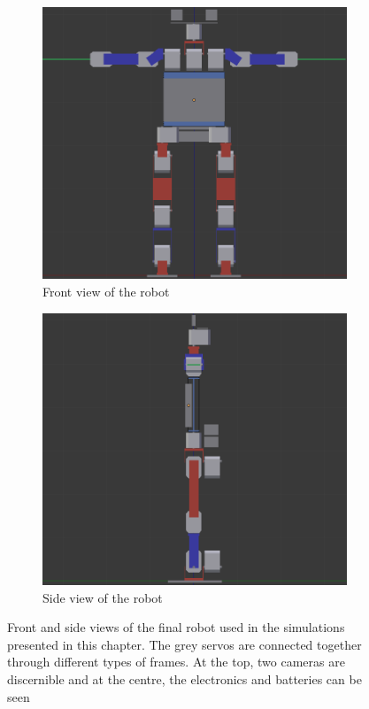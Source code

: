 \begin{figure}[htp]
\center
\begin{subfigure}[b]{0.45\textwidth}
    \includegraphics[width = \textwidth]{figures/robot_v7_front}
    \caption[]{Front view of the robot}
    \label{fig:robotv7_front}
\end{subfigure}
\hfill
\begin{subfigure}[b]{0.45\textwidth}
\center
    \includegraphics[width = \textwidth]{figures/robot_v7_side}
    \caption[]{Side view of the robot}
    \label{fig:robotv7_side}
\end{subfigure}
\caption[]{Front and side views of the final robot used in the simulations presented in this chapter. The grey servos are connected together through different types of frames. At the top, two cameras are discernible and at the centre, the electronics and batteries can be seen}
\label{fig:robotv7}
\end{figure}

